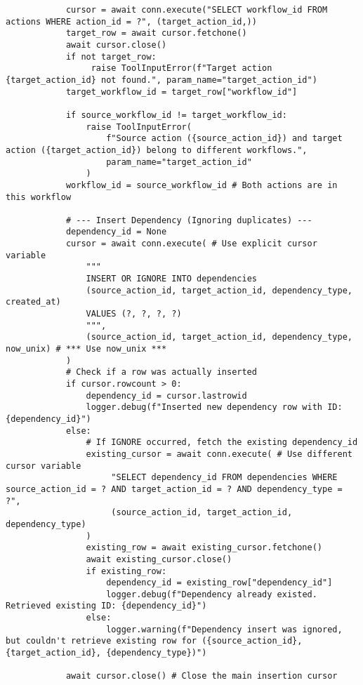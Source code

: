 \documentclass[12pt,a4paper]{article}
\begin{document}
\begin{pageablecode}
\begin{verbatim}
            cursor = await conn.execute("SELECT workflow_id FROM actions WHERE action_id = ?", (target_action_id,))
            target_row = await cursor.fetchone()
            await cursor.close()
            if not target_row:
                 raise ToolInputError(f"Target action {target_action_id} not found.", param_name="target_action_id")
            target_workflow_id = target_row["workflow_id"]

            if source_workflow_id != target_workflow_id:
                raise ToolInputError(
                    f"Source action ({source_action_id}) and target action ({target_action_id}) belong to different workflows.",
                    param_name="target_action_id"
                )
            workflow_id = source_workflow_id # Both actions are in this workflow

            # --- Insert Dependency (Ignoring duplicates) ---
            dependency_id = None
            cursor = await conn.execute( # Use explicit cursor variable
                """
                INSERT OR IGNORE INTO dependencies
                (source_action_id, target_action_id, dependency_type, created_at)
                VALUES (?, ?, ?, ?)
                """,
                (source_action_id, target_action_id, dependency_type, now_unix) # *** Use now_unix ***
            )
            # Check if a row was actually inserted
            if cursor.rowcount > 0:
                dependency_id = cursor.lastrowid
                logger.debug(f"Inserted new dependency row with ID: {dependency_id}")
            else:
                # If IGNORE occurred, fetch the existing dependency_id
                existing_cursor = await conn.execute( # Use different cursor variable
                     "SELECT dependency_id FROM dependencies WHERE source_action_id = ? AND target_action_id = ? AND dependency_type = ?",
                     (source_action_id, target_action_id, dependency_type)
                )
                existing_row = await existing_cursor.fetchone()
                await existing_cursor.close()
                if existing_row:
                    dependency_id = existing_row["dependency_id"]
                    logger.debug(f"Dependency already existed. Retrieved existing ID: {dependency_id}")
                else:
                    logger.warning(f"Dependency insert was ignored, but couldn't retrieve existing row for ({source_action_id}, {target_action_id}, {dependency_type})")

            await cursor.close() # Close the main insertion cursor


\end{verbatim}
\end{pageablecode}
\end{document}
